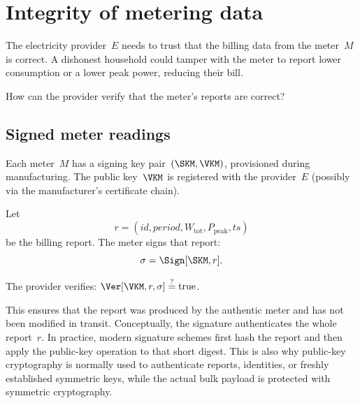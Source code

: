 \section{Integrity of metering data}\label{EnergyMeteringIntegrity}


The electricity provider~\(E\) needs to trust that the billing data from the
meter~\(M\) is correct.
A dishonest household could tamper with the meter to report lower consumption
or a lower peak power, reducing their bill.

\begin{exercise}
  How can the provider verify that the meter's reports are correct?
\end{exercise}

\subsection{Signed meter readings}

Each meter~\(M\) has a signing key pair~\((\SKM, \VKM)\), provisioned during
manufacturing.
The public key~\(\VKM\) is registered with the provider~\(E\) (possibly via
the manufacturer's certificate chain).

Let
\[
  r = (\mathit{id}, \mathit{period}, W_{\text{tot}}, P_{\text{peak}},
  \mathit{ts})
\]
be the billing report.
The meter signs that report:
\[
  \sigma = \Sign[\SKM, r].
\]

The provider verifies:
\(\Ver[\VKM, r, \sigma] \stackrel{?}{=} \text{true}\).

This ensures that the report was produced by the authentic meter and has not
been modified in transit.
Conceptually, the signature authenticates the whole report~\(r\).
In practice, modern signature schemes first hash the report and then apply the
public-key operation to that short digest.
This is also why public-key cryptography is normally used to authenticate
reports, identities, or freshly established symmetric keys, while the actual
bulk payload is protected with symmetric cryptography.

